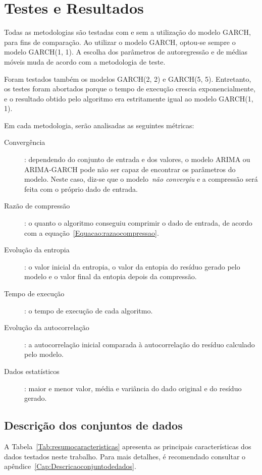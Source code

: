 \chapter{Testes e Resultados}
\label{Capitulo:testes}

Todas as metodologias são testadas com e sem a utilização do modelo GARCH, para
fins de comparação. Ao utilizar o modelo GARCH, optou-se sempre o modelo
GARCH(1, 1). A escolha dos parâmetros de autoregressão e de médias móveis muda
de acordo com a metodologia de teste.

Foram testados também os modelos GARCH(2, 2) e GARCH(5, 5). Entretanto, os
testes foram abortados porque o tempo de execução crescia exponencialmente, e o resultado
obtido pelo algoritmo era estritamente igual ao modelo GARCH(1, 1).

Em cada metodologia, serão analisadas as seguintes métricas:

\begin{description}
    \item[Convergência]: dependendo do conjunto de entrada e dos valores, o
    modelo ARIMA ou ARIMA-GARCH pode não ser capaz de encontrar os parâmetros do
    modelo. Neste caso, diz-se que o modelo~\emph{não convergiu} e a compressão
    será feita com o próprio dado de entrada.
    \item[Razão de compressão]: o quanto o algoritmo conseguiu comprimir o dado
    de entrada, de acordo com a equação~\ref{Equacao:razaocompressao}.
    \item[Evolução da entropia]: o valor inicial da entropia, o valor da entopia
    do resíduo gerado pelo modelo e o valor final da entopia depois da
    compressão.
    \item[Tempo de execução]: o tempo de execução de cada algoritmo.
    \item[Evolução da autocorrelação]: a autocorrelação inicial comparada à
    autocorrelação do resíduo calculado pelo modelo.    
    \item[Dados estatísticos]: maior e menor valor, média e variância do dado
    original e do resíduo gerado.
\end{description}

\section{Descrição dos conjuntos de dados}
\label{Sec:conjdados}

A Tabela~\ref{Tab:resumocaracteristicas} apresenta as
principais características dos dados testados neste trabalho. Para mais detalhes, é recomendado consultar o 
apêndice~\ref{Cap:Descricaoconjuntodedados}.

